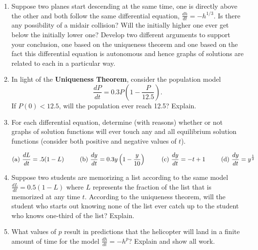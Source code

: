 \begin{enumerate}
\item Suppose two planes start descending at the same time, one is directly above the other and both follow the same differential equation, $\displaystyle\frac{dh}{dt}=-h^{1/3}$. Is there any possibility of a midair collision? Will the initially higher one ever get below the initially lower one? Develop two different arguments to support your conclusion, one based on the uniqueness theorem and one based on the fact this differential equation is autonomous and hence graphs of solutions are related to each in a particular way. \label{05HWproblem1}

\item In light of the \textbf{Uniqueness Theorem}, consider the population model \label{05HWproblem2} 
\[
\frac{dP}{dt}=0.3P\left(1-\frac{P}{12.5}\right).
\]
If $P(0) < 12.5$, will the population ever reach 12.5? Explain.

\item For each differential equation, determine (with reasons) whether or not graphs of solution functions will ever touch any and all equilibrium solution functions (consider both positive and negative values of $t$). \label{05HWproblem3}

\[
\text{(a) } \frac{dL}{dt}=.5(1-L) \hspace{.35in}\text{(b) } \frac{dy}{dt}=0.3y\left(1-\frac{y}{10}\right) \hspace{.35in} \text{(c) } \frac{dy}{dt}=-t+1 \hspace{.35in} \text{(d) } \frac{dy}{dt}=y^{\frac{1}{2}}
\]

\item	Suppose two students are memorizing a list according to the same model  $\displaystyle \frac{dL}{dt}=0.5(1-L)$  where $L$ represents the fraction of the list that is memorized at any time $t$. According to the uniqueness theorem, will the student who starts out knowing none of the list ever catch up to the student who knows one-third of the list? Explain. \label{05HWproblem4}

\item	What values of $p$ result in predictions that the helicopter will land in a finite amount of time for the model $\displaystyle\frac{dh}{dt} = -h^p$? Explain and show all work. \label{05HWproblem5}

\end{enumerate}


